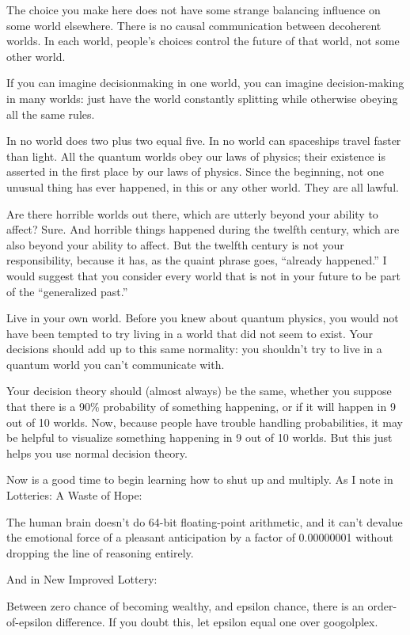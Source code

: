 {
 The choice you make here does not have some strange balancing
influence on some world elsewhere. There is no causal communication
between decoherent worlds. In each world, people's
choices control the future of that world, not some other world.}

{
 If you can imagine decisionmaking in one world, you can imagine
decision-making in many worlds: just have the world constantly
splitting while otherwise obeying all the same rules.}

{
 In no world does two plus two equal five. In no world can
spaceships travel faster than light. All the quantum worlds obey our
laws of physics; their existence is asserted in the first place by our
laws of physics. Since the beginning, not one unusual thing has ever
happened, in this or any other world. They are all lawful.}

{
 Are there horrible worlds out there, which are utterly beyond your
ability to affect? Sure. And horrible things happened during the
twelfth century, which are also beyond your ability to affect. But the
twelfth century is not your responsibility, because it has, as the
quaint phrase goes, ``already
happened.'' I would suggest that you consider every
world that is not in your future to be part of the
``generalized past.''}

{
 Live in your own world. Before you knew about quantum physics, you
would not have been tempted to try living in a world that did not seem
to exist. Your decisions should add up to this same normality: you
shouldn't try to live in a quantum world you
can't communicate with.}

{
 Your decision theory should (almost always) be the same, whether
you suppose that there is a 90\% probability of something happening, or
if it will happen in 9 out of 10 worlds. Now, because people have
trouble handling probabilities, it may be helpful to visualize
something happening in 9 out of 10 worlds. But this just helps you use
normal decision theory.}

{
 Now is a good time to begin learning how to shut up and multiply.
As I note in Lotteries: A Waste of Hope:}

{
 The human brain doesn't do 64-bit floating-point
arithmetic, and it can't devalue the emotional force of
a pleasant anticipation by a factor of 0.00000001 without dropping the
line of reasoning entirely.}

{
 And in New Improved Lottery:}

{
 Between zero chance of becoming wealthy, and epsilon chance, there
is an order-of-epsilon difference. If you doubt this, let epsilon equal
one over googolplex.}

